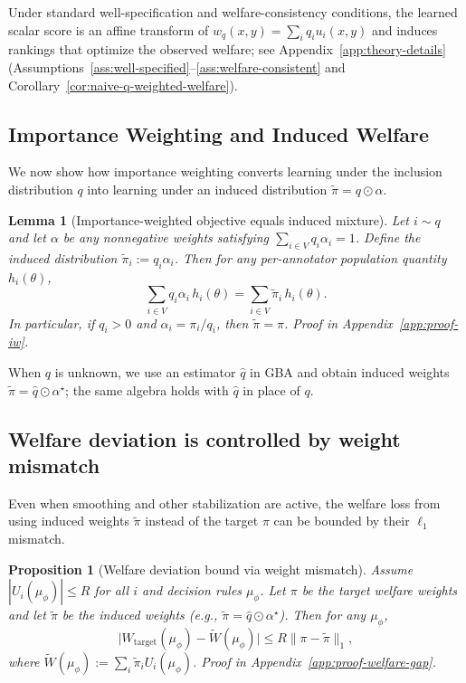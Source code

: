 \documentclass{article}
\theoremstyle{plain}
\newtheorem{proposition}[theorem]{Proposition}
\newtheorem{lemma}[theorem]{Lemma}
\theoremstyle{definition}
\theoremstyle{remark}
\begin{document}
Under standard well-specification and welfare-consistency conditions, the learned scalar score is an affine
transform of $w_q(x,y)=\sum_i q_i u_i(x,y)$ and induces rankings that optimize the observed welfare;
see Appendix~\ref{app:theory-details} (Assumptions~\ref{ass:well-specified}--\ref{ass:welfare-consistent} and
Corollary~\ref{cor:naive-q-weighted-welfare}).

\subsection{Importance Weighting and Induced Welfare}
\label{subsec:theory-unbiased}

We now show how importance weighting converts learning under the inclusion
distribution $q$ into learning under an induced distribution
$\tilde\pi = q\odot \alpha$.

\begin{lemma}[Importance-weighted objective equals induced mixture]
\label{lem:iw-identity}
Let $i\sim q$ and let $\alpha$ be any nonnegative weights satisfying
$\sum_{i\in V} q_i\alpha_i=1$. Define the induced distribution
$\tilde\pi_i := q_i\alpha_i$. Then for any per-annotator population quantity
$h_i(\theta)$,
\begin{equation}
    \sum_{i\in V} q_i\alpha_i\,h_i(\theta)
    =
    \sum_{i\in V}\tilde\pi_i\,h_i(\theta).
    \label{eq:iw-identity}
\end{equation}
In particular, if $q_i>0$ and $\alpha_i=\pi_i/q_i$, then $\tilde\pi=\pi$.
Proof in Appendix~\ref{app:proof-iw}.
\end{lemma}

When $q$ is unknown, we use an estimator $\hat q$ in GBA and obtain induced
weights $\tilde\pi=\hat q\odot \alpha^\star$; the same algebra holds with
$\hat q$ in place of $q$.
\subsection{Welfare deviation is controlled by weight mismatch}
\label{subsec:theory-gap}
Even when smoothing and other stabilization are active, the welfare loss from
using induced weights $\tilde\pi$ instead of the target $\pi$ can be bounded by
their $\ell_1$ mismatch.

\begin{proposition}[Welfare deviation bound via weight mismatch]
\label{prop:welfare-gap}
Assume $|U_i(\mu_\phi)|\le R$ for all $i$ and decision rules $\mu_\phi$.
Let $\pi$ be the target welfare weights and let $\tilde\pi$ be the induced
weights (e.g., $\tilde\pi=\hat q\odot \alpha^\star$).
Then for any $\mu_\phi$,
\begin{equation}
\big|W_{\mathrm{target}}(\mu_\phi)-\widetilde{W}(\mu_\phi)\big|
\le
R\|\pi-\tilde\pi\|_1,
\end{equation}
where $\widetilde{W}(\mu_\phi):=\sum_i \tilde\pi_i U_i(\mu_\phi)$.
Proof in Appendix~\ref{app:proof-welfare-gap}.
\end{proposition}
\end{document}
